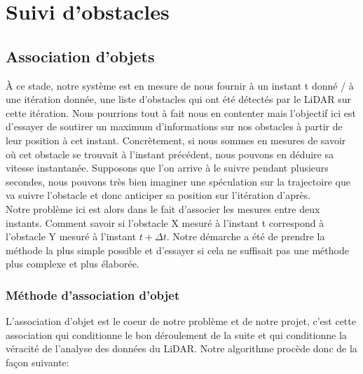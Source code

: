 \section{Suivi d'obstacles}

\subsection{Association d'objets}
\tab À ce stade, notre système est en mesure de nous fournir à un instant t donné / à une itération donnée, une liste d'obstacles qui ont été détectés par le LiDAR sur cette itération. Nous pourrions tout à fait nous en contenter mais l'objectif ici est d'essayer de soutirer un maximum d'informations sur nos obstacles à partir de leur position à cet instant. Concrètement, si nous sommes en mesures de savoir où cet obstacle se trouvait à l'instant précédent, nous pouvons en déduire sa vitesse instantanée. Supposons que l'on arrive à le suivre pendant plusieurs secondes, nous pouvons très bien imaginer une spéculation sur la trajectoire que va suivre l'obstacle et donc anticiper sa position sur l'itération d'après. \\
Notre problème ici est alors dans le fait d'associer les mesures entre deux instants. Comment savoir si l'obstacle X mesuré à l'instant t correspond à l'obstacle Y mesuré à l'instant $t+\Delta t$. Notre démarche a été de prendre la méthode la plus simple possible et d'essayer si cela ne suffisait pas une méthode plus complexe et plus élaborée.

\subsubsection{Méthode d'association d'objet}
\tab L'association d'objet est le coeur de notre problème et de notre projet, c'est cette association qui conditionne le bon déroulement de la suite et qui conditionne la véracité de l'analyse des données du LiDAR. Notre algorithme procède donc de la façon suivante:

